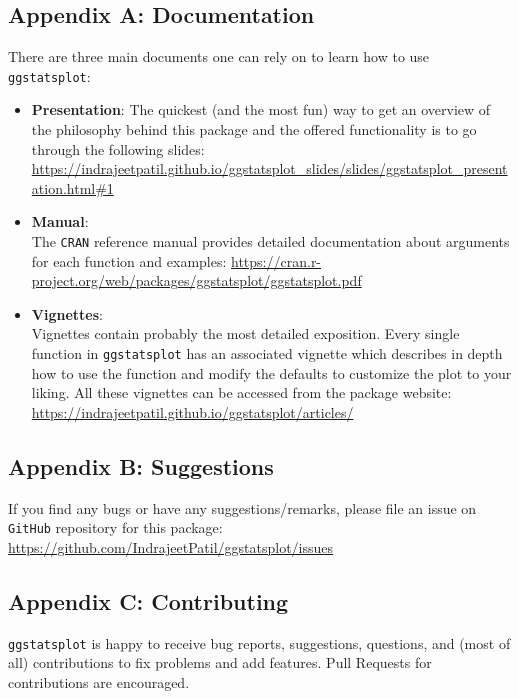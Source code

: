 \documentclass[]{article}
\begin{document}
\hypertarget{appendix-a-documentation}{%
\subsection{Appendix A: Documentation}\label{appendix-a-documentation}}

There are three main documents one can rely on to learn how to use
\texttt{ggstatsplot}:

\begin{itemize}
\item
  \textbf{Presentation}:
  The quickest (and the most fun) way to get an overview of
  the philosophy behind this package and the offered functionality is to go
  through the following slides:
  \url{https://indrajeetpatil.github.io/ggstatsplot_slides/slides/ggstatsplot_presentation.html\#1}
\item
  \textbf{Manual}:\\
  The \texttt{CRAN} reference manual provides detailed documentation about arguments
  for each function and examples:
  \url{https://cran.r-project.org/web/packages/ggstatsplot/ggstatsplot.pdf}
\item
  \textbf{Vignettes}:\\
  Vignettes contain probably the most detailed exposition. Every single
  function in \texttt{ggstatsplot} has an associated vignette which describes in
  depth how to use the function and modify the defaults to customize the plot
  to your liking. All these vignettes can be accessed from the package
  website: \url{https://indrajeetpatil.github.io/ggstatsplot/articles/}
\end{itemize}

\hypertarget{appendix-b-suggestions}{%
\subsection{Appendix B: Suggestions}\label{appendix-b-suggestions}}

If you find any bugs or have any suggestions/remarks, please file an issue on
\texttt{GitHub} repository for this package:
\url{https://github.com/IndrajeetPatil/ggstatsplot/issues}

\hypertarget{appendix-c-contributing}{%
\subsection{Appendix C: Contributing}\label{appendix-c-contributing}}

\texttt{ggstatsplot} is happy to receive bug reports, suggestions, questions, and (most
of all) contributions to fix problems and add features. Pull Requests for
contributions are encouraged.
\end{document}
